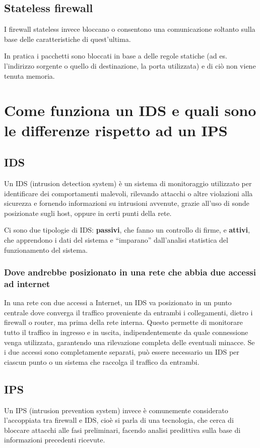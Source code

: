 \documentclass{report}
\begin{document}
\subsection{Stateless firewall}
I firewall stateless invece bloccano o consentono una comunicazione soltanto sulla base delle caratteristiche di quest'ultima. 

\noindent In pratica i pacchetti sono bloccati in base a delle regole statiche (ad es. l'indirizzo sorgente o quello di destinazione, la porta utilizzata) e di ciò non viene tenuta memoria.

\section{Come funziona un IDS e quali sono le differenze rispetto ad un IPS}
\subsection{IDS}
Un IDS (intrusion detection system) è un sistema di monitoraggio utilizzato per identificare dei comportamenti malevoli, rilevando attacchi o altre violazioni alla sicurezza e 
fornendo informazioni su intrusioni avvenute, grazie all'uso di sonde posizionate sugli host, oppure in certi punti della rete.

\noindent Ci sono due tipologie di IDS: \textbf{passivi}, che fanno un controllo di firme, e \textbf{attivi}, che apprendono i dati del sistema e “imparano” dall’analisi statistica del funzionamento del sistema.

\subsubsection{Dove andrebbe posizionato in una rete che abbia due accessi ad internet}
In una rete con due accessi a Internet, un IDS va posizionato in un punto centrale dove converga il traffico proveniente da entrambi i collegamenti, dietro i firewall o router, ma prima della rete interna. Questo permette di monitorare tutto il traffico in ingresso e in uscita, indipendentemente da quale connessione venga utilizzata, garantendo una rilevazione completa delle eventuali minacce. 
Se i due accessi sono completamente separati, può essere necessario un IDS per ciascun punto o un sistema che raccolga il traffico da entrambi.

\subsection{IPS}
Un IPS (intrusion prevention system) invece è comunemente considerato l'accoppiata tra firewall e IDS, cioè si parla di una tecnologia, 
che cerca di bloccare attacchi alle fasi preliminari, facendo analisi predittiva sulla base di informazioni precedenti ricevute.
\end{document}
